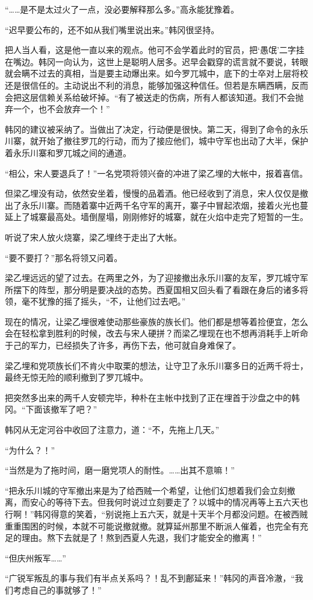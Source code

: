 “……是不是太过火了一点，没必要解释那么多。”高永能犹豫着。

“迟早要公布的，还不如从我们嘴里说出来。”韩冈很坚持。

把人当人看，这是他一直以来的观点。他可不会学着此时的官员，把‘愚氓’二字挂在嘴边。韩冈一向认为，这世上是聪明人居多。迟早会戳穿的谎言就不要说，转眼就会瞒不过去的真相，当是要主动爆出来。如今罗兀城中，底下的士卒对上层将校还是很信任的。主动说出不利的消息，能够加强这种信任。但若是东瞒西瞒，反而会把这层信赖关系给破坏掉。“有了被送走的伤病，所有人都该知道。我们不会抛弃一个，也不会放弃一个！”

韩冈的建议被采纳了。当做出了决定，行动便是很快。第二天，得到了命令的永乐川寨，就开始了撤往罗兀的行动，而为了接应他们，城中守军也出动了大半，保护着永乐川寨和罗兀城之间的通道。

“相公，宋人要退兵了！”一名党项将领兴奋的冲进了梁乙埋的大帐中，报着喜信。

但梁乙埋没有动，依然安坐着，慢慢的品着酒。他已经收到了消息，宋人仅仅是撤出了永乐川寨。而随着寨中近两千名守军的离开，寨子中冒起浓烟，接着火光也蔓延上了城寨最高处。墙倒屋塌，刚刚修好的城寨，就在火焰中走完了短暂的一生。

听说了宋人放火烧寨，梁乙埋终于走出了大帐。

“要不要打？”那名将领又问着。

梁乙埋远远的望了过去。在两里之外，为了迎接撤出永乐川寨的友军，罗兀城守军所摆下的阵型，那分明是要决战的态势。西夏国相又回头看了看跟在身后的诸多将领，毫不犹豫的摇了摇头，“不，让他们过去吧。”

现在的情况，让梁乙埋很难使动那些豪族的族长们。他们都是想等着捡便宜，怎么会在轻松拿到胜利的时候，改去与宋人硬拼？而梁乙埋现在也不想再消耗手上听命于己的军力，已经损失了许多，再伤下去，他可就自身难保了。

梁乙埋和党项族长们不肯火中取栗的想法，让守卫了永乐川寨多日的近两千将士，最终无惊无险的顺利撤到了罗兀城中。

把突然多出来的两千人安顿完毕，种朴在主帐中找到了正在埋首于沙盘之中的韩冈。“下面该撤军了吧？”

韩冈从无定河谷中收回了注意力，道：“不，先拖上几天。”

“为什么？！”

“当然是为了拖时间，磨一磨党项人的耐性。……出其不意嘛！”

“把永乐川城的守军撤出来是为了给西贼一个希望，让他们幻想着我们会立刻撤离，而安心的等待下去。但我何时说过立刻要走了？以城中的情况再等上五六天也行啊！”韩冈得意的笑着，“别说拖上五六天，就是十天半个月都没问题。在被西贼重重围困的时候，本就不可能说撤就撤。就算延州那里不断派人催着，也完全有充足的理由。熬下去就是了！熬到西夏人先退，我们才能安全的撤离！”

“但庆州叛军……”

“广锐军叛乱的事与我们有半点关系吗？！乱不到鄜延来！”韩冈的声音冷澈，“我们考虑自己的事就够了！”

